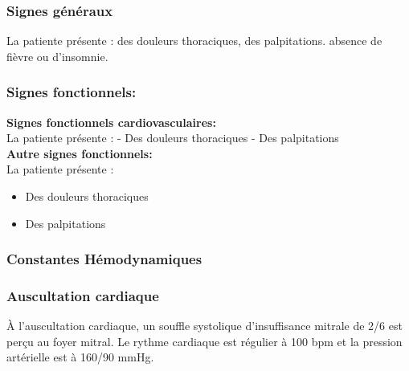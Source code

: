 \documentclass[12pt,a4paper]{article}%
\begin{document}
%
\subsubsection*{Signes généraux}%
\label{ssubsec:Signesgnraux}%

%
%
\vspace*{\baselineskip}%
La patiente présente : des douleurs thoraciques, des palpitations. absence de fièvre ou d'insomnie.%
\subsubsection*{Signes fonctionnels:}%
\label{ssubsec:Signesfonctionnels}%

%
\textbf{Signes fonctionnels cardiovasculaires:}%
\\%
La patiente présente :\newline%
{-} Des douleurs thoraciques\newline%
{-} Des palpitations%
\\%
\textbf{Autre signes fonctionnels:}%
\\%
La patiente présente :%
\begin{itemize}%
\setlength{\itemsep}{0pt}%
\item%
Des douleurs thoraciques%
\item%
Des palpitations%
\end{itemize}%
\subsubsection*{Constantes Hémodynamiques}%
\label{ssubsec:ConstantesHmodynamiques}%

%


\begin{table}[h!]%
\centering%
%
\end{table}

%
\subsubsection*{Auscultation cardiaque}%
\label{ssubsec:Auscultationcardiaque}%

%
À l'auscultation cardiaque, un souffle systolique d'insuffisance mitrale de 2/6 est perçu au foyer mitral. Le rythme cardiaque est régulier à 100 bpm et la pression artérielle est à 160/90 mmHg.%
\end{document}
